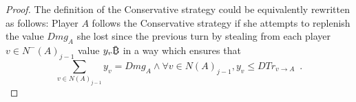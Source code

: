 \begin{proof}
  The definition of the Conservative strategy could be equivalently rewritten as follows: Player $A$ follows the Conservative
  strategy if she attempts to replenish the value $Dmg_A$ she lost since the previous turn by stealing from each player $v \in
  N^{-}\left(A\right)_{j-1}$ value $y_v\bitcoin$ in a way which ensures that
  \begin{equation*}
    \sum\limits_{v \in N\left(A\right)_{j-1}}y_v = Dmg_A \wedge \forall v \in N\left(A\right)_{j-1}, y_v \leq DTr_{v \rightarrow A} \enspace.
  \end{equation*}
\end{proof}
